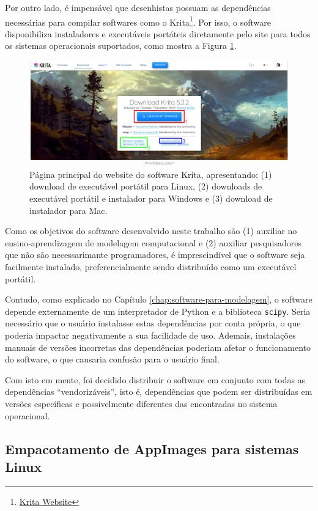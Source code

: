 \documentclass[
	12pt,				%
	openright,			%
	oneside,			%
	a4paper,			%
	main=brazil,
	english,			%
	]{ufsj-abntex2}
\begin{document}
Por outro lado, é impensável que desenhistas possuam as dependências necessárias para compilar softwares como o Krita\footnote{\href{https://krita.org/en/}{Krita Website}}. Por isso, o software disponibiliza instaladores e executáveis portáteis diretamente pelo site para todos os sistemas operacionais suportados, como mostra a Figura \ref{fig:krita-downloads}.

\begin{figure}[h]
    \centering
    \includegraphics[scale=0.28]{imgs/krita-download.png} 
    \caption{Página principal do website do software Krita, apresentando: (1) download de executável portátil para Linux, (2) downloads de executável portátil e instalador para Windows e (3) download de instalador para Mac.}
    \label{fig:krita-downloads}
\end{figure}

Como os objetivos do software desenvolvido neste trabalho são (1) auxiliar no ensino-aprendizagem de modelagem computacional e (2) auxiliar pesquisadores que não são necessarimante programadores, é imprescindível que o software seja facilmente instalado, preferencialmente sendo distribuído como um executável portátil.

Contudo, como explicado no Capítulo \ref{chap:software-para-modelagem}, o software depende externamente de um interpretador de Python e a biblioteca \texttt{scipy}. Seria necessário que o usuário instalasse estas dependências por conta própria, o que poderia impactar negativamente a sua facilidade de uso. Ademais, instalações manuais de versões incorretas das dependências poderiam afetar o funcionamento do software, o que causaria confusão para o usuário final.

Com isto em mente, foi decidido distribuir o software em conjunto com todas as dependências ``vendorizáveis'', isto é, dependências que podem ser distribuídas em versões específicas e possivelmente diferentes das encontradas no sistema operacional.

\subsection{Empacotamento de AppImages para sistemas Linux}
\end{document}
